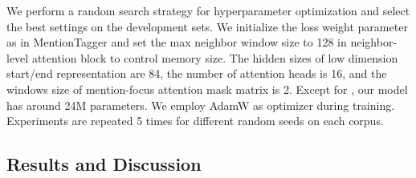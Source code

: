 \documentclass[11pt,a4paper]{article}
\begin{document}
We perform a random search strategy for hyperparameter optimization and select the best settings on the development sets.
We initialize the loss weight parameter as  in MentionTagger and set the max neighbor window size to 128 in neighbor-level attention block  to control memory size.
The hidden sizes of low dimension start/end representation  are 84, the number of attention heads is 16, and the windows size of mention-focus attention mask matrix  is 2.
Except for , our model has around 24M parameters.
We employ AdamW \cite{loshilov2017adamw} as optimizer during training.
Experiments are repeated 5 times for different random seeds on each corpus.

\subsection{Results and Discussion}
\end{document}
